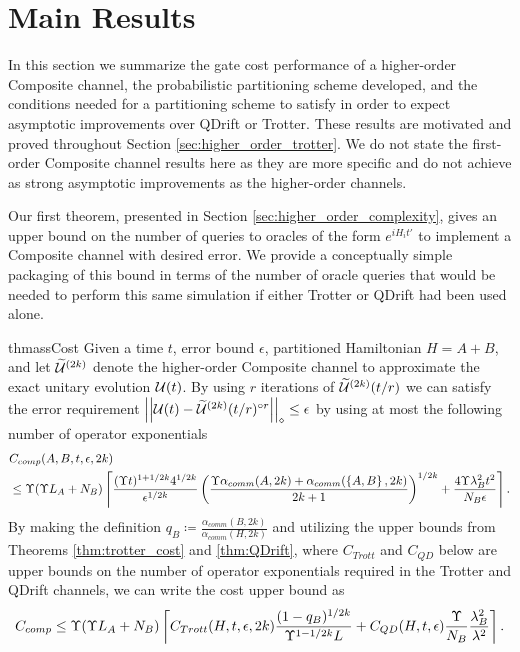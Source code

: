 \section{Main Results} \label{sec:main}
In this section we summarize the gate cost performance of a higher-order Composite channel, the probabilistic partitioning scheme developed, and the conditions needed for a partitioning scheme to satisfy in order to expect asymptotic improvements over QDrift or Trotter. These results are motivated and proved throughout Section \ref{sec:higher_order_trotter}. We do not state the first-order Composite channel results here as they are more specific and do not achieve as strong asymptotic improvements as the higher-order channels.

Our first theorem, presented in Section \ref{sec:higher_order_complexity}, gives an upper bound on the number of queries to oracles of the form $e^{i H_i t'}$ to implement a Composite channel with desired error. We provide a conceptually simple packaging of this bound in terms of the number of oracle queries that would be needed to perform this same simulation if either Trotter or QDrift had been used alone.
\begin{restatable}{thm}{assCost} \label{thm:higher_order_cost_fixed}
Given a time $t$, error bound $\epsilon$, partitioned Hamiltonian $H = A + B$, and let $\widetilde{\mathcal{U}}^{(2k)}$ denote the higher-order Composite channel to approximate the exact unitary evolution $\mathcal{U}(t)$. By using $r$ iterations of $\widetilde{\mathcal{U}}^{(2k)}(t/r)$ we can satisfy the error requirement $\left| \left| \mathcal{U}(t) - \widetilde{\mathcal{U}}^{(2k)}(t/r)^{\circ r} \right| \right|_\diamond \leq \epsilon$ by using at most the following number of operator exponentials
\begin{align}
    &C_{comp}(A,B, t, \epsilon, 2k) \nonumber \\
    &\leq \Upsilon (\Upsilon L_A + N_B) \left\lceil \frac{(\Upsilon t)^{1 + 1/2k} 4^{1/2k}}{\epsilon^{1/2k}} \left( \frac{\Upsilon \alpha_{comm}(A, 2k) + \alpha_{comm}(\left\{ A,B \right\}, 2k)}{2k+1} \right)^{1/2k} + \frac{4 \Upsilon \lambda_B^2 t^2}{N_B \epsilon} \right\rceil.
\end{align}
By making the definition $q_B \coloneqq\frac{\alpha_{comm}(B,2k)}{\alpha_{comm}(H, 2k)}$ and utilizing the upper bounds from Theorems \ref{thm:trotter_cost} and \ref{thm:QDrift}, where $C_{Trott}$ and $C_{QD}$ below are  upper bounds on the number of operator exponentials required in the Trotter and QDrift channels, we can write the cost upper bound as
\begin{align}
    C_{comp} \leq \Upsilon (\Upsilon L_A + N_B) \left\lceil C_{Trott}(H, t, \epsilon, 2k) \frac{(1-q_B)^{1/2k}}{\Upsilon^{1- 1/2k}L} + C_{QD}(H, t, \epsilon) \frac{\Upsilon}{N_B} \frac{\lambda_B^2}{\lambda^2} \right\rceil.
\end{align}
\end{restatable}

